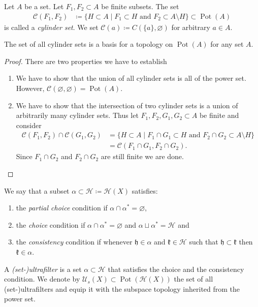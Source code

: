 \begin{defin}
  \label{def:pot-top}
  Let \(A\) be a set. Let \(F_1, F_2 \subset A\) be finite subsets. The set
  \begin{align*}
    \mathcal{C}(F_1, F_2) & \coloneqq \{ H \subset A \mid F_1 \subset H \text{ and } F_2 \subset A \setminus H\} \subset \operatorname{Pot}(A)
  \end{align*}
  is called a \emph{cylinder set}. We set \(\mathcal{C}(a) \coloneqq C(\{a\}, \varnothing)\) for arbitrary \(a \in A\).
\end{defin}

\begin{prop}
  \label{prop:pot-top}
  The set of all cylinder sets is a basis for a topology on \(\operatorname{Pot}(A)\) for any set \(A\).
\end{prop}

\begin{proof}
  There are two properties we have to establish
  \begin{enumerate}
  \item We have to show that the union of all cylinder sets is all of the power set. However, \(\mathcal{C}(\varnothing, \varnothing) = \operatorname{Pot}(A)\).
  \item We have to show that the intersection of two cylinder sets is a union of arbitrarily many cylinder sets. Thus let \(F_1, F_2, G_1, G_2 \subset A\) be finite and consider
  \begin{align*}
    \mathcal{C}(F_1, F_2) \cap \mathcal{C}(G_1, G_2)
    & = \{H \subset A \mid F_1 \cap G_1 \subset H \text{ and } F_2 \cap G_2 \subset A \setminus H\}\\
    & = \mathcal{C}(F_1 \cap G_1, F_2 \cap G_2).
  \end{align*}
  Since \(F_1 \cap G_2\) and \(F_2 \cap G_2\) are still finite we are done.
  \end{enumerate}
\end{proof}

\begin{defin}
  We say that a subset \(\alpha \subset \mathcal{H} \coloneqq \mathcal{H}(X)\) satisfies:
  \begin{enumerate}
  \item the \emph{partial choice} condition if \(\alpha \cap \alpha^\ast = \varnothing\),
  \item the \emph{choice} condition if \(\alpha \cap \alpha^\ast = \varnothing\) and \(\alpha \sqcup \alpha^\ast = \mathcal{H}\) and
  \item the \emph{consistency} condition if whenever \(\mathfrak{h} \in \alpha\) and \(\mathfrak{k} \in \mathcal{H}\) such that \(\mathfrak{h} \subset \mathfrak{k}\) then \(\mathfrak{k} \in \alpha\).
  \end{enumerate}
  A \emph{(set-)ultrafilter} is a set \(\alpha \subset \mathcal{H}\) that satisfies the choice and the consistency condition. We denote by \(\mathcal{U}_s(X) \subset \operatorname{Pot}(\mathcal{H}(X))\) the set of all (set-)ultrafilters and equip it with the subspace topology inherited from the power set.
\end{defin}

